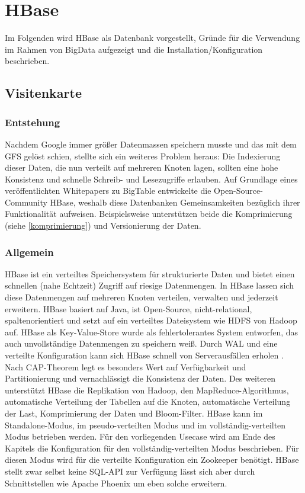 \section{HBase}



Im Folgenden wird HBase als Datenbank vorgestellt, Gründe  für die Verwendung im Rahmen von BigData aufgezeigt und die Installation/Konfiguration beschrieben.
\subsection{Visitenkarte}
\subsubsection{Entstehung}
Nachdem Google immer größer Datenmassen speichern musste und das mit dem  \ac{GFS} gelöst schien, stellte sich ein weiteres Problem heraus: Die Indexierung dieser Daten, die nun verteilt auf mehreren Knoten lagen, sollten eine hohe Konsistenz und schnelle Schreib- und Lesezugriffe erlauben. Auf Grundlage eines veröffentlichten Whitepapers zu BigTable \cite{bigtable} entwickelte die Open-Source-Community HBase, weshalb diese Datenbanken Gemeinsamkeiten bezüglich ihrer Funktionalität aufweisen. Beispielsweise unterstützen beide die Komprimierung (siehe \ref{komprimierung}) und Versionierung der Daten.

\subsubsection{Allgemein}
HBase ist ein verteiltes Speichersystem für strukturierte Daten und bietet einen schnellen (nahe Echtzeit) Zugriff auf riesige Datenmengen. In HBase lassen sich diese Datenmengen auf mehreren Knoten verteilen, verwalten und jederzeit erweitern. HBase basiert auf Java, ist Open-Source, nicht-relational, spaltenorientiert und setzt auf ein verteiltes Dateisystem wie HDFS von Hadoop auf. HBase als Key-Value-Store wurde als fehlertolerantes System entworfen, das auch unvollständige Datenmengen zu speichern weiß. Durch \ac{WAL} und eine verteilte Konfiguration kann sich HBase schnell von Serverausfällen erholen \cite{Redt01}. Nach CAP-Theorem legt es besonders Wert auf Verfügbarkeit und Partitionierung und vernachlässigt die Konsistenz der Daten. Des weiteren unterstützt HBase die Replikation von Hadoop, den MapReduce-Algorithmus, automatische Verteilung der Tabellen auf die Knoten, automatische Verteilung der Last, Komprimierung der Daten und Bloom-Filter. HBase kann im Standalone-Modus, im pseudo-verteilten Modus und im vollständig-verteilten Modus betrieben werden. Für den vorliegenden Usecase wird am Ende des Kapitels die Konfiguration für den vollständig-verteilten Modus beschrieben. Für diesen Modus wird für die verteilte Konfiguration ein Zookeeper benötigt. HBase stellt zwar selbst keine SQL-API zur Verfügung lässt sich aber durch Schnittstellen wie Apache Phoenix um eben solche erweitern.

